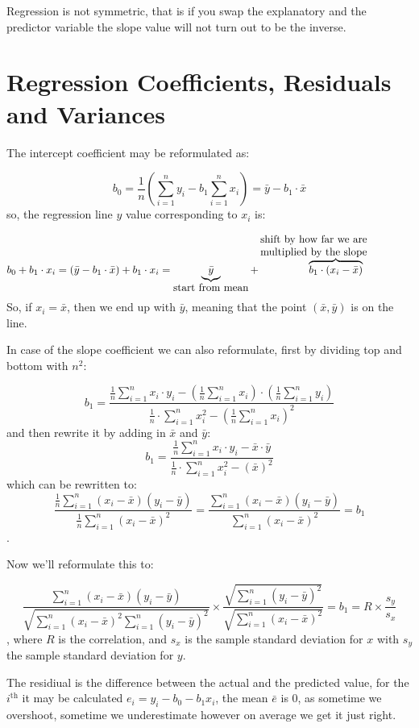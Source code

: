 Regression is not symmetric, that is if you swap the explanatory and the
predictor variable the slope value will not turn out to be the inverse.

\section{Regression Coefficients, Residuals and Variances}

The intercept coefficient may be reformulated as:

\[b_0 = \frac{1}{n} \left( \sum_{i=1}^{n} y _i - b_1 \sum_{i=1}^{n} x_i \right)
 = \bar{y} - b_1 \cdot \bar{x} \] so, the regression line $y$ value
 corresponding to $x_i$ is:
 
 \[ b_0+b_1\cdot x_i = (\bar{y} - b_1 \cdot \bar{x}) + b_1 \cdot x_i =
 \underbrace{\bar{y}}_{\mbox{start from mean}} + \overbrace{b_1 \cdot (x_i -
 \bar{x})}^{\parbox[t]{5cm}{shift by how far we are \\ multiplied by the slope}}
 \] 
So, if $x_i=\bar{x}$, then we end up with $\bar{y}$, meaning that the point
$(\bar{x}, \bar{y})$ is on the line.

In case of the slope coefficient we can also reformulate, first by dividing top
and bottom with $n^2$:

\[ b_1 = \frac{\frac{1}{n} \sum_{i=1}^{n} x_i \cdot y_i -
\left( \frac{1}{n} \sum_{i=1}^{n} x_i \right) \cdot \left(
\frac{1}{n} \sum_{i=1}^{n} y_i \right)}{\frac{1}{n} \cdot \sum_{i=1}^{n} x_i^2 -
\left(\frac{1}{n} \sum_{i=1}^{n} x_i \right)^2} \] and then rewrite it by adding
in $\bar{x}$ and $\bar{y}$:
\[ b_1 = \frac{\frac{1}{n} \sum_{i=1}^{n} x_i \cdot y_i -
\bar{x} \cdot \bar{y}}{\frac{1}{n} \cdot \sum_{i=1}^{n} x_i^2 -
\left(\bar{x} \right)^2}\] which can be rewritten to: 
\[ \frac{\frac{1}{n} \sum_{i=1}^{n} (x_i - \bar{x})(y_i - \bar{y})
}{\frac{1}{n}\sum_{i=1}^{n}\left( x_i - \bar{x} \right)^2} = \frac{
\sum_{i=1}^{n} (x_i - \bar{x})(y_i - \bar{y}) }{\sum_{i=1}^{n}\left(
x_i - \bar{x} \right)^2} = b_1 \].

Now we'll reformulate this to: 

\[ \frac{\sum_{i=1}^{n}(x_i - \bar{x})(y_i - \bar{y})}{\sqrt{\sum_{i=1}^{n}(x_i
- \bar{x})^2 \sum_{i=1}^{n}(y_i -
\bar{y})^2}} \times \frac{\sqrt{\sum_{i=1}^{n}(y_i - \bar{y})^2}}
{\sqrt{\sum_{i=1}^{n}(x_i - \bar{x})^2}} = b_1 = R \times \frac{s_y}{s_x}\],
where $R$ is the correlation, and $s_x$ is the sample standard deviation for $x$
with $s_y$ the sample standard deviation for $y$.

The residiual is the difference between the actual and the predicted value, for
the $i^{\mbox{th}}$ it may be calculated $e_i=y_i-b_0-b_1 x_i$, the mean
$\bar{e}$ is $0$, as sometime we overshoot, sometime we underestimate however on
average we get it just right. 

